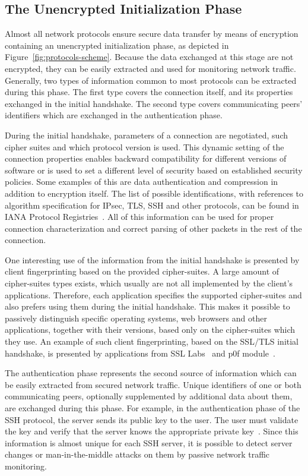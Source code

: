 \subsection{The Unencrypted Initialization Phase}

Almost all network protocols ensure secure data transfer by means of encryption containing an unencrypted initialization phase, as depicted in Figure~\ref{fig:protocols-scheme}. Because the data exchanged at this stage are not encrypted, they can be easily extracted and used for monitoring network traffic. Generally, two types of information common to most protocols can be extracted during this phase. The first type covers the connection itself, and its properties exchanged in the initial handshake. The second type covers communicating peers' identifiers which are exchanged in the authentication phase.

During the initial handshake, parameters of a connection are negotiated, such cipher suites and which protocol version is used. This dynamic setting of the connection properties enables backward compatibility for different versions of software or is used to set a different level of security based on established security policies. Some examples of this are data authentication and compression in addition to encryption itself. The list of possible identifications, with references to algorithm specification for IPsec, TLS, SSH and other protocols, can be found in IANA Protocol Registries~\cite{iana-protocol-registries}. All of this information can be used for proper connection characterization and correct parsing of other packets in the rest of the connection.

One interesting use of the information from the initial handshake is presented by client fingerprinting based on the provided cipher-suites. A large amount of cipher-suites types exists, which usually are not all implemented by the client's applications. Therefore, each application specifies the supported cipher-suites and also prefers using them during the initial handshake. This makes it possible to passively distinguish specific operating systems, web browsers and other applications, together with their versions, based only on the cipher-suites which they use. An example of such client fingerprinting, based on the SSL/TLS initial handshake, is presented by applications from SSL Labs~\cite{qualys-ssl-fingerprinting} and p0f module~\cite{p0f-ssl-fingerprint}.

The authentication phase represents the second source of information which can be easily extracted from secured network traffic. Unique identifiers of one or both communicating peers, optionally supplemented by additional data about them, are exchanged during this phase. For example, in the authentication phase of the SSH protocol, the server sends its public key to the user. The user must validate the key and verify that the server knows the appropriate private key~\cite{rfc4253}. Since this information is almost unique for each SSH server, it is possible to detect server changes or man-in-the-middle attacks on them by passive network traffic monitoring. 

